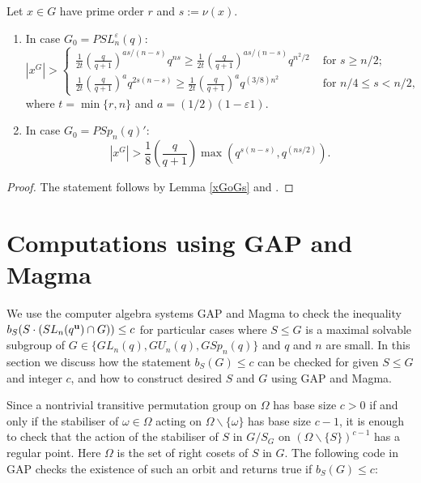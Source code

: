 \begin{Lem}
Let $x \in G$ have prime order $r$ and $s:=\nu(x).$
\begin{enumerate}[font=\normalfont]
\item In case ${G_0}=PSL_n^{\varepsilon}(q)$:
\begin{equation}\label{5uni}
 |x^G| > 
\begin{cases}
  \frac{1}{2t} \left(\frac{q}{q+1} \right)^{as/(n-s)} q^{ns} \ge \frac{1}{2t} \left(\frac{q}{q+1} \right)^{as/(n-s)} q^{n^2/2}  & \text{ for } s \ge n/2;\\
  \frac{1}{2t} \left(\frac{q}{q+1} \right)^{a} q^{2s(n-s)} \ge  
\frac{1}{2t} \left(\frac{q}{q+1} \right)^{a}  q^{(3/8)n^2}  & \text{ for }  n/4 \le s < n/2,
\end{cases}
\end{equation}
where $t = \min\{r,n\}$ and $a=(1/2)(1- \varepsilon 1)$.
\item In case $G_0=PSp_n(q)'$:
\begin{equation}\label{5simp}
|x^G| > 
  \frac{1}{8} \left(\frac{q}{q+1} \right) \max(q^{s(n-s)}, q^{(ns/2)}).
\end{equation}
\end{enumerate}
\end{Lem}
\begin{proof}
The statement follows by Lemma \ref{xGoGs} and \cite[Propositions 3.22 and 3.36, Lemmas 3.34 and 3.38]{fpr2}.
\end{proof}




\section{Computations using {\sf GAP} and {\sc Magma}}
\label{gapsec}

We use the  computer algebra systems {\sf GAP} \cite{GAP4} and {\sc Magma} \cite{magma}  to check the inequality $b_S(S \cdot(SL_n(q^{\bf u}) \cap G))\le c$ for  particular cases where $S \le G$ is a maximal solvable subgroup of $G \in \{GL_n(q), GU_n(q), GSp_n(q) \}$ and $q$ and $n$ are small. In this section we discuss how the statement $b_S(G)\le c$ can be checked for given  $S \le G$ and integer $c$, and how to construct desired $S$ and $G$ using {\sf GAP} and {\sc Magma}.

Since a nontrivial transitive permutation group on $\Omega$ has base size $c>0$ if and only if the stabiliser of  $\omega \in \Omega$ acting on $\Omega \backslash \{\omega\}$ has base size $c-1$, it is enough to check that the action of the stabiliser of $S$ in $G/S_G$ on $(\Omega \backslash \{S\})^{c-1}$ has a regular point. Here $\Omega$ is the set of right cosets of $S$ in $G$. The following code in {\sf GAP} checks the existence of such an orbit  and returns {\sf true} if $b_S(G) \le c$: 

